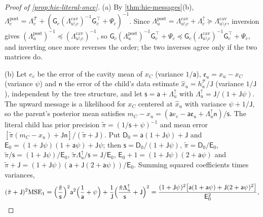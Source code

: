 \begin{proof}[Proof of \cref{prop:hie-literal-once}]
(a) By \cref{thm:hie-messages}(b), $\Lambda^{\mathrm{post}}_c=\Lambda^{\mathcal T}_c+(\mathsf G_c(\Lambda^{\mathrm{cav}}_{u\setminus c})^{-1}\mathsf G_c^\top+\Psi_c)^{-1}$. Since $\Lambda^{\mathrm{post}}_u=\Lambda^{\mathrm{cav}}_{u\setminus c}+\Lambda^\uparrow_c\succeq\Lambda^{\mathrm{cav}}_{u\setminus c}$, inversion gives $(\Lambda^{\mathrm{post}}_u)^{-1}\preceq(\Lambda^{\mathrm{cav}}_{u\setminus c})^{-1}$, so $\mathsf G_c(\Lambda^{\mathrm{post}}_u)^{-1}\mathsf G_c^\top+\Psi_c\preceq\mathsf G_c(\Lambda^{\mathrm{cav}}_{u\setminus c})^{-1}\mathsf G_c^\top+\Psi_c$, and inverting once more reverses the order; the two inverses agree only if the two matrices do.

(b) Let $e_c$ be the error of the cavity mean of $x_C$ (variance $1/\mathsf a$), $\mathfrak e_u=x_u-x_C$ (variance $\psi$) and $\mathsf n$ the error of the child's data estimate $\hat x_u=h^{\mathcal T}_u/\mathsf J$ (variance $1/\mathsf J$), independent by the tree structure, and let $\mathsf s=\mathsf a+\Lambda^\uparrow_u$ with $\Lambda^\uparrow_u=\mathsf J/(1+\mathsf J\psi)$. The upward message is a likelihood for $x_C$ centered at $\hat x_u$ with variance $\psi+1/\mathsf J$, so the parent's posterior mean satisfies $m_C-x_u=(\mathsf ae_c-\mathsf a\mathfrak e_u+\Lambda^\uparrow_u\mathsf n)/\mathsf s$. The literal child has prior precision $\tilde\pi=(1/\mathsf s+\psi)^{-1}$ and mean error $[\tilde\pi(m_C-x_u)+\mathsf J\mathsf n]/(\tilde\pi+\mathsf J)$. Put $\mathsf D_0=\mathsf a(1+\mathsf J\psi)+\mathsf J$ and $\mathsf E_0=(1+\mathsf J\psi)(1+\mathsf a\psi)+\mathsf J\psi$; then $\mathsf s=\mathsf D_0/(1+\mathsf J\psi)$, $\tilde\pi=\mathsf D_0/\mathsf E_0$, $\tilde\pi/\mathsf s=(1+\mathsf J\psi)/\mathsf E_0$, $\tilde\pi\Lambda^\uparrow_u/\mathsf s=\mathsf J/\mathsf E_0$, $\mathsf E_0+1=(1+\mathsf J\psi)(2+\mathsf a\psi)$ and $\tilde\pi+\mathsf J=(1+\mathsf J\psi)(\mathsf a+\mathsf J(2+\mathsf a\psi))/\mathsf E_0$. Summing squared coefficients times variances,
\[
(\tilde\pi+\mathsf J)^2\mathrm{MSE}_1=\Bigl(\frac{\tilde\pi}{\mathsf s}\Bigr)^2\mathsf a^2\Bigl(\frac1{\mathsf a}+\psi\Bigr)+\frac1{\mathsf J}\Bigl(\frac{\tilde\pi\Lambda^\uparrow_u}{\mathsf s}+\mathsf J\Bigr)^2=\frac{(1+\mathsf J\psi)^2\bigl[\mathsf a(1+\mathsf a\psi)+\mathsf J(2+\mathsf a\psi)^2\bigr]}{\mathsf E_0^2},
\]

\end{proof}
